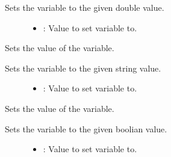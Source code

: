 \documentclass[letterpaper,10pt,english]{sphinxmanual}
\begin{document}
\begin{fulllineitems}
\begin{fulllineitems}
Sets the variable to the given double value. \begin{description}
\item[{}] \leavevmode\begin{itemize}
\item {} 
: Value to set variable to. 

\end{itemize}

\end{description}


\end{fulllineitems}


\begin{fulllineitems}
\label{\detokenize{index:_CPPv2N7ostendo3VaraSENSt6stringE}}%
\pysigstartmultiline
{}\label{\detokenize{index:Pessumstructostendo_1_1Var_1a5f9e9d7249cd02d28765d21bf3a80fe5}}%
\pysigstopmultiline
Sets the value of the variable. 

Sets the variable to the given string value. \begin{description}
\item[{}] \leavevmode\begin{itemize}
\item {} 
: Value to set variable to. 

\end{itemize}

\end{description}


\end{fulllineitems}


\begin{fulllineitems}
\label{\detokenize{index:_CPPv2N7ostendo3VaraSEb}}%
\pysigstartmultiline
{}\label{\detokenize{index:Pessumstructostendo_1_1Var_1a33de8632f442f7751af96d471dae1321}}%
\pysigstopmultiline
Sets the value of the variable. 

Sets the variable to the given boolian value. \begin{description}
\item[{}] \leavevmode\begin{itemize}
\item {} 
: Value to set variable to. 


\end{itemize}
\end{description}
\end{fulllineitems}
\end{fulllineitems}
\end{document}
